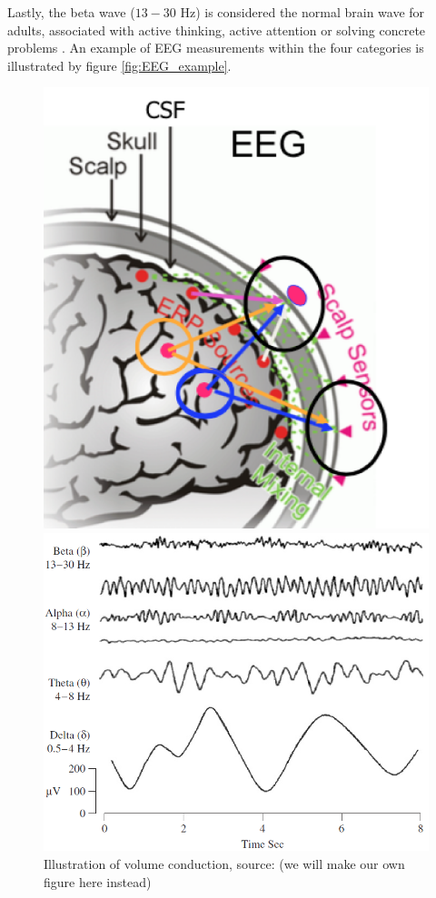 Lastly, the beta wave ($13-30$ Hz) is considered the normal brain wave for adults, associated with active thinking, active attention or solving concrete problems \cite[p. 11]{EEGsignalprocessing}. 
An example of EEG measurements within the four categories is illustrated by figure \ref{fig:EEG_example}.
\begin{figure}[H]
    \begin{minipage}[t]{.45\textwidth}
        \centering
        \includegraphics[width=\textwidth]{figurs/scalp.png}
        \caption{Illustration of volume conduction, source: \cite{phd2015}(we will make our own figure here instead)}\label{fig:volumeconduction}
    \end{minipage} 
    \hfill
    \begin{minipage}[t]{.45\textwidth}
        \centering
        \includegraphics[width=\textwidth]{figurs/EEG_example.png}

\end{minipage}
\end{figure}
